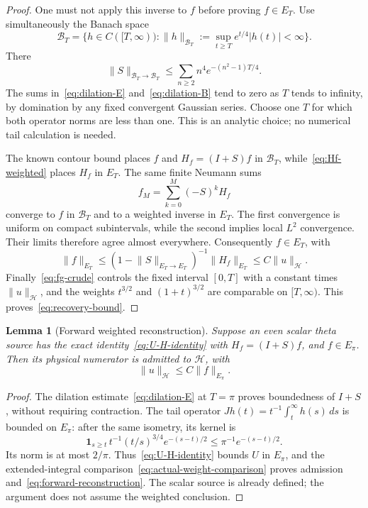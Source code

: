 \documentclass[11pt,a4paper]{article}
\numberwithin{equation}{section}
\newtheorem{lemma}[theorem]{Lemma}
\theoremstyle{definition}
\theoremstyle{remark}
\newcommand{\Hh}{\mathcal H}
\newcommand{\norm}[1]{\lVert #1\rVert}
\begin{document}
\begin{proof}
One must not apply this inverse to $f$ before proving $f\in E_T$. Use simultaneously the Banach space
\[
 \mathcal B_T=\{h\in C([T,\infty)):
       \norm{h}_{\mathcal B_T}:=\sup_{t\ge T}e^{t/4}|h(t)|<\infty\}.
\]
There
\begin{equation}\label{eq:dilation-B}
 \norm{S}_{\mathcal B_T\to\mathcal B_T}
 \le\sum_{n\ge2}n^4e^{-(n^2-1)T/4}.
\end{equation}
The sums in~\eqref{eq:dilation-E} and~\eqref{eq:dilation-B} tend to zero as $T$ tends to infinity, by domination by any fixed convergent Gaussian series. Choose one $T$ for which both operator norms are less than one. This is an analytic choice; no numerical tail calculation is needed.

The known contour bound places $f$ and $H_f=(I+S)f$ in $\mathcal B_T$, while~\eqref{eq:Hf-weighted} places $H_f$ in $E_T$. The same finite Neumann sums
\[
 f_M=\sum_{k=0}^M(-S)^kH_f
\]
converge to $f$ in $\mathcal B_T$ and to a weighted inverse in $E_T$. The first convergence is uniform on compact subintervals, while the second implies local $L^2$ convergence. Their limits therefore agree almost everywhere. Consequently $f\in E_T$, with
\[
 \norm{f}_{E_T}\le
 (1-\norm{S}_{E_T\to E_T})^{-1}\norm{H_f}_{E_T}
 \le C\norm{u}_{\Hh}.
\]
Finally~\eqref{eq:fg-crude} controls the fixed interval $[0,T]$ with a constant times $\norm{u}_{\Hh}$, and the weights $t^{3/2}$ and $(1+t)^{3/2}$ are comparable on $[T,\infty)$. This proves~\eqref{eq:recovery-bound}.
\end{proof}

\begin{lemma}[Forward weighted reconstruction]\label{lem:forward-reconstruction}
Suppose an even scalar theta source has the exact identity~\eqref{eq:U-H-identity} with $H_f=(I+S)f$, and $f\in E_\pi$. Then its physical numerator is admitted to $\Hh$, with
\begin{equation}\label{eq:forward-reconstruction}
 \norm{u}_{\Hh}\le C\norm{f}_{E_\pi}.
\end{equation}
\end{lemma}
\begin{proof}
The dilation estimate~\eqref{eq:dilation-E} at $T=\pi$ proves boundedness of $I+S$, without requiring contraction. The tail operator
$Jh(t)=t^{-1}\int_t^\infty h(s)\,ds$ is bounded on $E_\pi$: after the same isometry, its kernel is
\[
 \boldsymbol1_{s\ge t}\,t^{-1}(t/s)^{3/4}e^{-(s-t)/2}
 \le\pi^{-1}e^{-(s-t)/2}.
\]
Its norm is at most $2/\pi$. Thus~\eqref{eq:U-H-identity} bounds $U$ in $E_\pi$, and the extended-integral comparison~\eqref{eq:actual-weight-comparison} proves admission and~\eqref{eq:forward-reconstruction}. The scalar source is already defined; the argument does not assume the weighted conclusion.
\end{proof}
\end{document}
